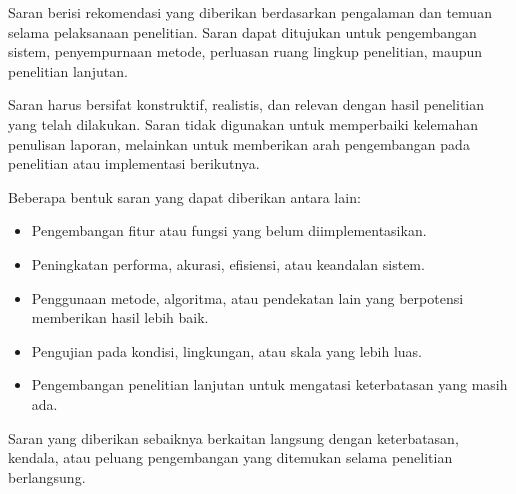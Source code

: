 Saran berisi rekomendasi yang diberikan berdasarkan pengalaman dan temuan selama pelaksanaan penelitian. Saran dapat ditujukan untuk pengembangan sistem, penyempurnaan metode, perluasan ruang lingkup penelitian, maupun penelitian lanjutan.

Saran harus bersifat konstruktif, realistis, dan relevan dengan hasil penelitian yang telah dilakukan. Saran tidak digunakan untuk memperbaiki kelemahan penulisan laporan, melainkan untuk memberikan arah pengembangan pada penelitian atau implementasi berikutnya.

Beberapa bentuk saran yang dapat diberikan antara lain:

\begin{itemize}[topsep=0pt,itemsep=0pt,parsep=0pt,leftmargin=*]
\item Pengembangan fitur atau fungsi yang belum diimplementasikan.
\item Peningkatan performa, akurasi, efisiensi, atau keandalan sistem.
\item Penggunaan metode, algoritma, atau pendekatan lain yang berpotensi memberikan hasil lebih baik.
\item Pengujian pada kondisi, lingkungan, atau skala yang lebih luas.
\item Pengembangan penelitian lanjutan untuk mengatasi keterbatasan yang masih ada.
\end{itemize}

Saran yang diberikan sebaiknya berkaitan langsung dengan keterbatasan, kendala, atau peluang pengembangan yang ditemukan selama penelitian berlangsung.
